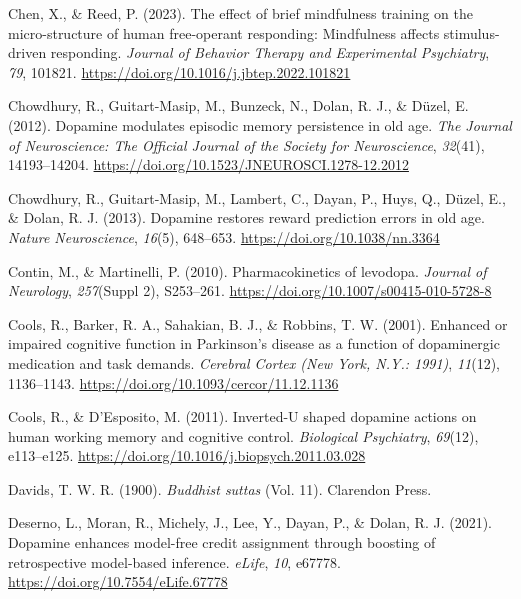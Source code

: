 \documentclass[
  man]{apa6}
\newlength{\cslhangindent}
\newlength{\cslentryspacingunit} %
\newenvironment{CSLReferences}[2] %
 {%
  \setlength{\parindent}{0pt}
  \ifodd #1
  \let\oldpar\par
  \def\par{\hangindent=\cslhangindent\oldpar}
  \fi
  \setlength{\parskip}{#2\cslentryspacingunit}
 }%
 {}
\begin{document}
\begin{CSLReferences}{1}{0}
\leavevmode{}%
Chen, X., \& Reed, P. (2023). The effect of brief mindfulness training on the micro-structure of human free-operant responding: {Mindfulness} affects stimulus-driven responding. \emph{Journal of Behavior Therapy and Experimental Psychiatry}, \emph{79}, 101821. \url{https://doi.org/10.1016/j.jbtep.2022.101821}

\leavevmode{}%
Chowdhury, R., Guitart-Masip, M., Bunzeck, N., Dolan, R. J., \& Düzel, E. (2012). Dopamine modulates episodic memory persistence in old age. \emph{The Journal of Neuroscience: The Official Journal of the Society for Neuroscience}, \emph{32}(41), 14193--14204. \url{https://doi.org/10.1523/JNEUROSCI.1278-12.2012}

\leavevmode{}%
Chowdhury, R., Guitart-Masip, M., Lambert, C., Dayan, P., Huys, Q., Düzel, E., \& Dolan, R. J. (2013). Dopamine restores reward prediction errors in old age. \emph{Nature Neuroscience}, \emph{16}(5), 648--653. \url{https://doi.org/10.1038/nn.3364}

\leavevmode{}%
Contin, M., \& Martinelli, P. (2010). Pharmacokinetics of levodopa. \emph{Journal of Neurology}, \emph{257}(Suppl 2), S253--261. \url{https://doi.org/10.1007/s00415-010-5728-8}

\leavevmode{}%
Cools, R., Barker, R. A., Sahakian, B. J., \& Robbins, T. W. (2001). Enhanced or impaired cognitive function in {Parkinson}'s disease as a function of dopaminergic medication and task demands. \emph{Cerebral Cortex (New York, N.Y.: 1991)}, \emph{11}(12), 1136--1143. \url{https://doi.org/10.1093/cercor/11.12.1136}

\leavevmode{}%
Cools, R., \& D'Esposito, M. (2011). Inverted-{U} shaped dopamine actions on human working memory and cognitive control. \emph{Biological Psychiatry}, \emph{69}(12), e113--e125. \url{https://doi.org/10.1016/j.biopsych.2011.03.028}

\leavevmode{}%
Davids, T. W. R. (1900). \emph{Buddhist suttas} (Vol. 11). {Clarendon Press}.

\leavevmode{}%
Deserno, L., Moran, R., Michely, J., Lee, Y., Dayan, P., \& Dolan, R. J. (2021). Dopamine enhances model-free credit assignment through boosting of retrospective model-based inference. \emph{eLife}, \emph{10}, e67778. \url{https://doi.org/10.7554/eLife.67778}


\end{CSLReferences}
\end{document}
